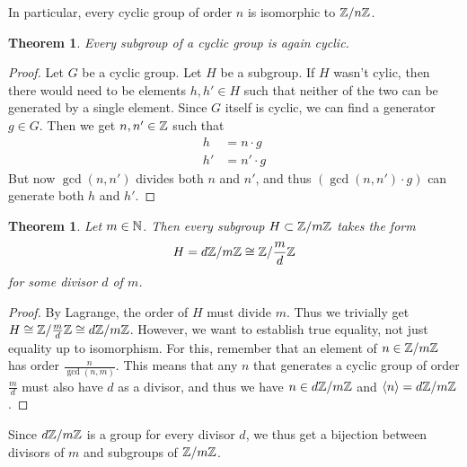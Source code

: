 \documentclass[10pt]{report}
\newtheorem{theorem}[lemma]{Theorem}
\theoremstyle{definition}
\begin{document}
	In particular, every cyclic group of order $n$ is isomorphic to $\mathbb{Z}/n\mathbb{Z}$.
	\begin{theorem}
		Every subgroup of a cyclic group is again cyclic.
	\end{theorem}
	\begin{proof}
		Let $G$ be a cyclic group. Let $H$ be a subgroup. If $H$ wasn't cylic, then there would need to be elements $h, h' \in H$ such that neither of the two can be generated by a single element.
		\newpar
		Since $G$ itself is cyclic, we can find a generator $g \in G$. Then we get $n,n' \in \mathbb{Z}$ such that
		\begin{align*}
			h &= n \cdot g\\
			h'&= n' \cdot g
		\end{align*}
		But now $\gcd(n, n')$ divides both $n$ and $n'$, and thus $(\gcd(n, n') \cdot g)$ can generate both $h$ and $h'$.
	\end{proof}
	\begin{theorem}
		Let $m \in \mathbb{N}$. Then every subgroup $H \subset \mathbb{Z}/m\mathbb{Z}$ takes the form
		\begin{align*}
			H = d\mathbb{Z}/m\mathbb{Z} \cong \mathbb{Z}/\frac{m}{d}\mathbb{Z}
		\end{align*}
		for some divisor $d$ of $m$.
	\end{theorem}
	\begin{proof}
		By Lagrange, the order of $H$ must divide $m$. Thus we trivially get $H  \cong \mathbb{Z}/\frac{m}{d}\mathbb{Z} \cong d\mathbb{Z}/m\mathbb{Z}$.
		\newpar
		However, we want to establish true equality, not just equality up to isomorphism. For this, remember that an element of $n \in \mathbb{Z}/m\mathbb{Z}$ has order $\frac{n}{\gcd(n,m)}$. This means that any $n$ that generates a cyclic group of order $\frac{m}{d}$ must also have $d$ as a divisor, and thus we have $n \in d\mathbb{Z}/m\mathbb{Z}$ and $\left\langle n \right\rangle = d\mathbb{Z}/m\mathbb{Z}$.
	\end{proof}
	Since $d\mathbb{Z}/m\mathbb{Z}$ is a group for every divisor $d$, we thus get a bijection between divisors of $m$ and subgroups of $\mathbb{Z}/m\mathbb{Z}$.
\end{document}
